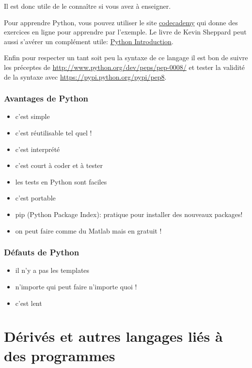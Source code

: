 Il est donc utile de le connaître si vous avez à enseigner.

Pour apprendre Python, vous pouvez utiliser le site 
\href{http://www.codecademy.com/tracks/python}{codecademy} 
qui donne des exercices en ligne pour apprendre par l'exemple.
Le livre de Kevin Sheppard peut aussi s'avérer un compl\'ement utile: 
\href{http://www.kevinsheppard.com/images/0/09/Python_introduction.pdf}{Python Introduction}.

Enfin pour respecter un tant soit peu la syntaxe de ce langage il est bon de suivre les préceptes
de \url{http://www.python.org/dev/peps/pep-0008/} et tester la validité  de la syntaxe avec
\url{https://pypi.python.org/pypi/pep8}.

\subsubsection*{Avantages de Python}
\begin{itemize}
\item c'est simple
\item c'est réutilisable tel quel ! 
\item c'est interprété
\item c'est court à coder et à  tester
\item les tests en Python sont faciles %
\item c'est portable
\item pip (Python Package Index):  pratique pour installer des nouveaux packages!
\item on peut faire comme du Matlab mais en gratuit ! %
\end{itemize}

\subsubsection*{Défauts de Python}
\begin{itemize}
\item il n'y a pas les templates
\item n'importe qui peut faire n'importe quoi ! %
\item c'est lent
\end{itemize}

\section{Dérivés et autres langages liés à des programmes}


